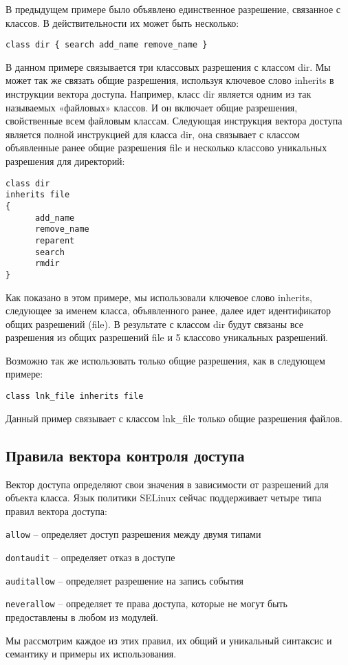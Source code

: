 \documentclass{./../class/UIR}
\begin{document}
    В предыдущем примере было объявлено единственное разрешение, связанное с
    классов. В действительности их может быть несколько:
\begin{verbatim}
class dir { search add_name remove_name }
\end{verbatim}
    В данном примере связывается три классовых разрешения с классом dir. Мы может
    так же связать общие разрешения, используя ключевое слово inherits в инструкции
    вектора доступа. Например, класс dir является одним из так называемых «файловых»
    классов. И он включает общие разрешения, свойственные всем файловым классам.
    Следующая инструкция вектора доступа является полной инструкцией для класса dir,
    она связывает с классом объявленные ранее общие разрешения file и несколько
    классово уникальных разрешения для директорий:
\begin{verbatim}
class dir
inherits file
{
      add_name
	  remove_name
      reparent
      search
      rmdir
}
\end{verbatim}
    Как показано в этом примере, мы использовали ключевое слово inherits, следующее
    за именем класса, объявленного ранее, далее идет идентификатор общих разрешений
    (file). В результате с классом dir будут связаны все разрешения из общих
    разрешений file и 5 классово уникальных разрешений.

    Возможно так же использовать только общие разрешения, как в следующем примере:
    \begin{verbatim}
class lnk_file inherits file
    \end{verbatim}
    Данный пример связывает с классом lnk\_file только общие разрешения файлов.

\subsection{Правила вектора контроля доступа}

    Вектор доступа определяют свои значения в зависимости от разрешений для
    объекта класса. Язык политики SELinux сейчас поддерживает четыре типа правил
    вектора доступа:
    \begin{description}
      \item \verb"allow" – определяет доступ разрешения между двумя типами
      \item \verb"dontaudit" – определяет отказ в доступе
      \item \verb"auditallow" – определяет разрешение на запись события
      \item \verb"neverallow"  – определяет те права доступа, которые не могут
      быть предоставлены в любом из модулей.
    \end{description}
    Мы рассмотрим каждое из этих правил, их общий и уникальный синтаксис и
    семантику и примеры их использования.
\end{document}
